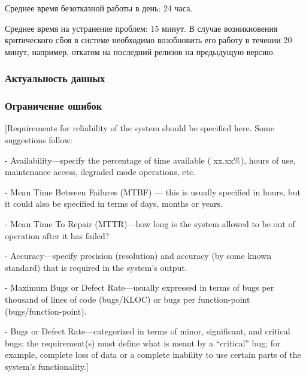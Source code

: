 Среднее время безотказной работы в день: 24 часа.

Среднее время на устранение проблем: 15 минут.
В случае возникновения критического сбоя в системе
необходимо возобновить его работу в течении 20 минут,
например, откатом на последний релизов на 
предыдущую версию.

\subsubsection{Актуальность данных}

\subsubsection{Ограничение ошибок}


[Requirements for reliability of the system should
 be specified here. Some suggestions follow:

- Availability—specify the percentage of time 
  available ( xx.xx\%), hours of use, maintenance 
  access, degraded mode operations, etc.

- Mean Time Between Failures (MTBF) — this is 
  usually specified in hours, but it could also 
  be specified in terms of days, months or years.

- Mean Time To Repair (MTTR)—how long is the 
  system allowed to be out of operation after it 
  has failed?

- Accuracy—specify precision (resolution) and 
  accuracy (by some known standard) that is required
  in the system’s output.

- Maximum Bugs or Defect Rate—usually expressed 
  in terms of bugs per thousand of lines of code 
  (bugs/KLOC) or bugs per function-point
  (bugs/function-point).
  
- Bugs or Defect Rate—categorized in terms of 
  minor, significant, and critical bugs: the 
  requirement(s) must define what is meant by 
  a “critical” bug; for example, complete loss 
  of data or a complete inability to use certain 
  parts of the system’s functionality.]
